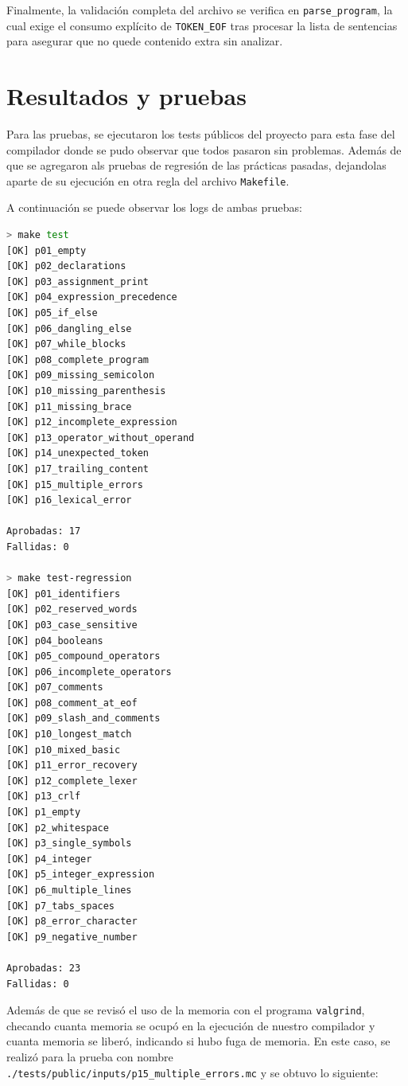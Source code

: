 \documentclass[12pt]{article}
\begin{document}
Finalmente, la validación completa del archivo se verifica en \verb|parse_program|,
 la cual exige el consumo explícito de \verb|TOKEN_EOF| tras procesar la lista de 
 sentencias para asegurar que no quede contenido extra sin analizar.

\section{Resultados y pruebas}

Para las pruebas, se ejecutaron los tests públicos del proyecto para esta fase del compilador
donde se pudo observar que todos pasaron sin problemas. Además de que se agregaron als pruebas
de regresión de las prácticas pasadas, dejandolas aparte de su ejecución en otra regla 
del archivo \texttt{Makefile}.

A continuación se puede observar los logs de ambas pruebas:

\begin{lstlisting}[language=BASH, breaklines=true]
> make test                                                      
[OK] p01_empty
[OK] p02_declarations
[OK] p03_assignment_print
[OK] p04_expression_precedence
[OK] p05_if_else
[OK] p06_dangling_else
[OK] p07_while_blocks
[OK] p08_complete_program
[OK] p09_missing_semicolon
[OK] p10_missing_parenthesis
[OK] p11_missing_brace
[OK] p12_incomplete_expression
[OK] p13_operator_without_operand
[OK] p14_unexpected_token
[OK] p17_trailing_content
[OK] p15_multiple_errors
[OK] p16_lexical_error

Aprobadas: 17
Fallidas: 0

> make test-regression
[OK] p01_identifiers
[OK] p02_reserved_words
[OK] p03_case_sensitive
[OK] p04_booleans
[OK] p05_compound_operators
[OK] p06_incomplete_operators
[OK] p07_comments
[OK] p08_comment_at_eof
[OK] p09_slash_and_comments
[OK] p10_longest_match
[OK] p10_mixed_basic
[OK] p11_error_recovery
[OK] p12_complete_lexer
[OK] p13_crlf
[OK] p1_empty
[OK] p2_whitespace
[OK] p3_single_symbols
[OK] p4_integer
[OK] p5_integer_expression
[OK] p6_multiple_lines
[OK] p7_tabs_spaces
[OK] p8_error_character
[OK] p9_negative_number

Aprobadas: 23
Fallidas: 0

\end{lstlisting}

Además de que se revisó el uso de la memoria con el programa \texttt{valgrind}, checando
cuanta memoria se ocupó en la ejecución de nuestro compilador y cuanta memoria se liberó,
indicando si hubo fuga de memoria. En este caso, se realizó para la prueba con
nombre \verb|./tests/public/inputs/p15_multiple_errors.mc| y se obtuvo lo siguiente:
\end{document}
